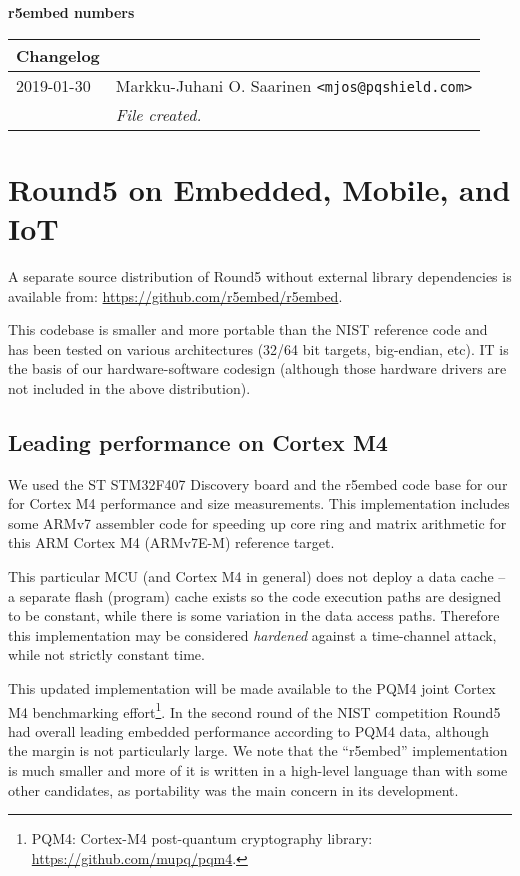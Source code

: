 \documentclass[a4paper]{article}
\begin{document}
\begin{center}
	{\large {\bf r5embed numbers \pdfdate}}

\vspace{3ex}
\begin{tabular}{l p{90mm}}
{\bf Changelog} \\
\hline
2019-01-30	& Markku-Juhani O. Saarinen \verb|<mjos@pqshield.com>| \\
			& {\it File created.}	\\
\hline
\end{tabular}
\end{center}


\section{Round5 on Embedded, Mobile, and IoT}

A separate source distribution of Round5 without external library
dependencies is available from: \url{https://github.com/r5embed/r5embed}.

This codebase is smaller and more portable than the NIST reference code and has
been tested on various architectures (32/64 bit targets, big-endian, etc). IT is
the basis of our hardware-software codesign (although those hardware drivers
are not included in the above distribution).


\subsection{Leading performance on Cortex M4}

We used the ST STM32F407 Discovery board and the r5embed code base for our
for Cortex M4 performance and size measurements. This implementation
includes some ARMv7 assembler code for speeding up core ring and matrix
arithmetic for this ARM Cortex M4 (ARMv7E-M) reference target.

This particular MCU (and Cortex M4 in general) does not deploy a data cache --
a separate flash (program) cache exists so the code execution paths are
designed to be constant, while there is some variation in the data
access paths. Therefore this implementation may be considered \emph{hardened}
against a time-channel attack, while not strictly constant time.

This updated implementation will be made available to the PQM4 joint Cortex M4
benchmarking effort\footnote{PQM4: Cortex-M4 post-quantum cryptography library:
\url{https://github.com/mupq/pqm4}.}. In the second round of the NIST
competition Round5 had overall leading embedded performance according to PQM4
data, although the margin is not particularly large. We note that the
``r5embed'' implementation is much smaller and more of it is written in a
high-level language than with some other candidates, as portability was the
main concern in its development.
\end{document}
